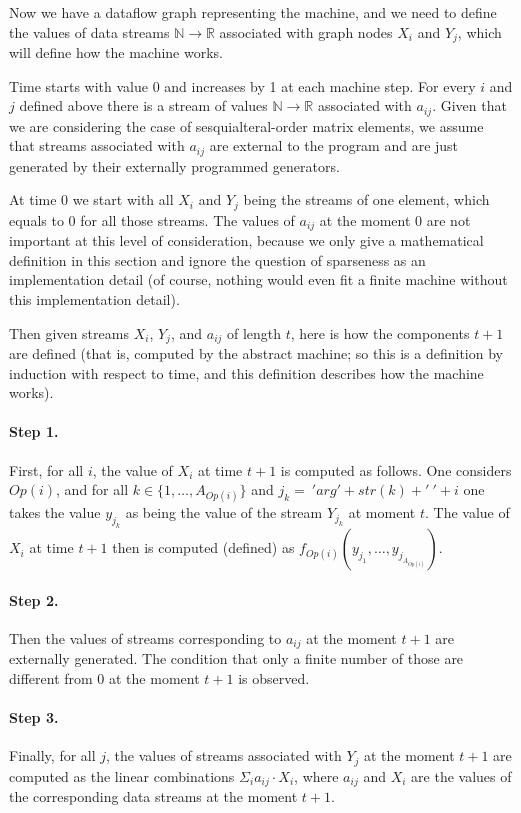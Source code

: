 \documentclass[withtimes]{easychair}
\begin{document}
Now we have a dataflow graph representing the machine, and we need to define
the values of data streams $\mathbb{N} \rightarrow \mathbb{R}$ associated with
graph nodes $X_i$ and $Y_j$, which will define how the machine works.

Time starts with value 0 and increases by 1 at each machine step. For every $i$ and $j$
defined above there is a stream of values $\mathbb{N} \rightarrow \mathbb{R}$
associated with $a_{ij}$. Given that we are considering the case of
sesquialteral-order matrix elements, we assume that streams associated with
$a_{ij}$ are external to the program and are just generated by their
externally programmed generators.

At time 0 we start with all $X_i$ and $Y_j$ being the streams of one element,
which equals to 0 for all those streams. The values of $a_{ij}$ at the moment 0
are not important at this level of consideration, because we only give a mathematical
definition in this section and ignore the question of sparseness as an
implementation detail (of course, nothing would even fit a finite machine
without this implementation detail).

Then given streams $X_i$, $Y_j$, and $a_{ij}$ of length $t$, here is how
the components $t+1$ are defined (that is, computed by the abstract machine; so this is a definition by
induction with respect to time, and this definition describes how the machine works).

\paragraph{Step 1.} First, for all $i$, the value of $X_i$ at time $t+1$ is computed as follows.
One considers $Op(i)$, and for all  $k \in \{1, \dots, A_{Op(i)}\}$ and $j_k =\ 'arg' + str(k) + '\ ' + i$ one
takes the value $y_{j_k}$ as being the value of the stream $Y_{j_k}$ at moment $t$.
The value of $X_i$ at time $t+1$ then is computed (defined) as $f_{Op(i)}(y_{j_1} , \dots, y_{j_{A_{Op(i)}}})$.

\paragraph{Step 2.} Then the values of streams corresponding to $a_{ij}$ at the moment $t+1$ are externally generated.
The condition that only a finite number of those are different from 0 at the moment $t+1$ is observed.

\paragraph{Step 3.} Finally, for all $j$, the values of streams associated with $Y_j$ at the moment $t+1$ are computed as the linear
combinations $\Sigma_i a_{ij} \cdot X_i$, where $a_{ij}$ and $X_i$ are the values of the corresponding
data streams at the moment $t+1$.
\end{document}
